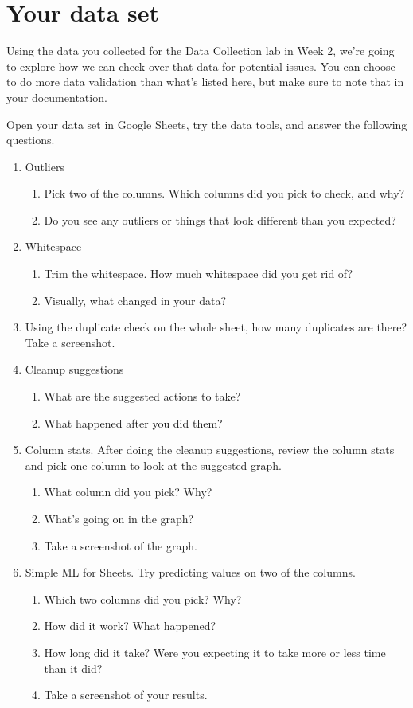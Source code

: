 \documentclass[12pt]{article}
\begin{document}
\section*{Your data set}
Using the data you collected for the Data Collection lab in Week 2, we're going to explore how we can check over that data for potential issues.  You can choose to do more data validation than what's listed here, but make sure to note that in your documentation.

Open your data set in Google Sheets, try the data tools, and answer the following questions.
    \begin{enumerate}
        \item Outliers
        \begin{enumerate}
            \item Pick two of the columns. Which columns did you pick to check, and why?
            \item Do you see any outliers or things that look different than you expected?
        \end{enumerate}
        \item Whitespace
        \begin{enumerate}
            \item Trim the whitespace. How much whitespace did you get rid of?
            \item Visually, what changed in your data?
        \end{enumerate}
        \item Using the duplicate check on the whole sheet, how many duplicates are there? Take a screenshot.
        \item Cleanup suggestions
        \begin{enumerate}
            \item What are the suggested actions to take?
            \item What happened after you did them?
        \end{enumerate}
        \item Column stats. After doing the cleanup suggestions, review the column stats and pick one column to look at the suggested graph.
        \begin{enumerate}
            \item What column did you pick? Why?
            \item What's going on in the graph?
            \item Take a screenshot of the graph.
        \end{enumerate}
        \item Simple ML for Sheets. Try predicting values on two of the columns.
        \begin{enumerate}
            \item Which two columns did you pick? Why?
            \item How did it work? What happened?
            \item How long did it take? Were you expecting it to take more or less time than it did?
            \item Take a screenshot of your results.
        \end{enumerate}
    \end{enumerate}
\end{document}

